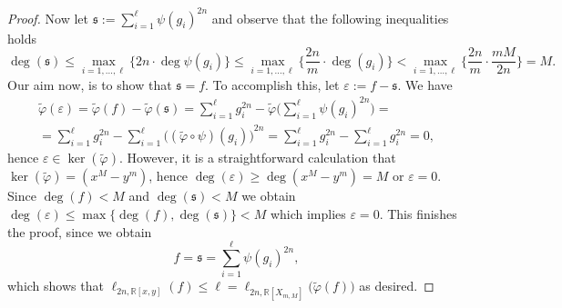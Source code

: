 \documentclass[10pt,a4paper]{amsart}
\newcommand{\R}{\mathbb{R}}
\begin{document}
\begin{proof}
    
    Now let $\mathfrak{s} := \sum_{i=1}^{\ell} {\psi(g_i)}^{2n}$ and observe that the following inequalities holds
    $$
    \deg(\mathfrak{s}) \leq \max_{i =1,\dots,\ell} \Big\{ 
    2n \cdot \deg \psi(g_i) 
    \Big\} 
    \leq
    \max_{i =1,\dots,\ell} \bigg\{ 
    \frac{2n}{m} \cdot \deg(g_i) 
    \bigg\}
    <
    \max_{i =1,\dots,\ell} \bigg\{ 
    \frac{2n}{m} \cdot \frac{mM}{2n} 
    \bigg\} = M.
    $$
    Our aim now, is to show that $\mathfrak{s} = f$. To accomplish this, let $\varepsilon := f -\mathfrak{s}$. We have
    \begin{multline*}
    \widetilde{\varphi} (\varepsilon) = \widetilde{\varphi}(f) - \widetilde{\varphi}(\mathfrak{s}) = 
    \sum_{i=1}^\ell g_i^{2n} - 
    \widetilde{\varphi}
    \Bigg(
    \sum_{i=1}^{\ell} {\psi(g_i)}^{2n}
    \Bigg)
    =
    \\
    =
    \sum_{i=1}^\ell g_i^{2n} - 
    \sum_{i=1}^{\ell} 
    {
    \Big(
    (\widetilde{\varphi} \circ \psi)(g_i)
    \Big)}^{2n} = 
    \sum_{i=1}^\ell g_i^{2n} - \sum_{i=1}^\ell g_i^{2n} = 0,
    \end{multline*}
    hence $\varepsilon \in \ker (\widetilde{\varphi})$. However, it is a straightforward calculation that $\ker (\widetilde{\varphi}) = (x^M - y^m)$, hence $\deg(\varepsilon) \geq \deg(x^M - y^m) = M$ or $\varepsilon = 0$. Since $\deg(f) < M$ and $\deg(\mathfrak{s}) < M$ we obtain $\deg(\varepsilon) \leq \max \big\{ \deg(f), \deg(\mathfrak{s}) \big\} < M$ which implies $\varepsilon = 0$. This finishes the proof, since we obtain
    $$
    f = \mathfrak{s} = \sum_{i=1}^{\ell} {\psi(g_i)}^{2n},
    $$
    which shows that $\ell_{2n,\R[x,y]}(f) \leq \ell = \ell_{2n,\R[X_{m,M}]}
    \big(
    \widetilde{\varphi}(f)
    \big)$ as desired.
\end{proof}
\end{document}

